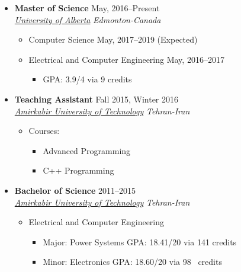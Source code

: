 \documentclass[10pt,a4paper,sans]{moderncv} %
\begin{document}
\begin{itemize}
	\item \textbf{Master of Science} \hfill May, 2016--Present \\ 
	\href{https://ualberta.ca/}{ \emph{University of Alberta}} \hfill \emph{Edmonton-Canada}
	\begin{itemize}
		\item Computer Science \hspace{10 pt}  \hspace{10 pt}  \hfill  May, 2017–2019 (Expected)
		\item Electrical and Computer Engineering \hspace{10 pt}  \hspace{10 pt}  \hfill  May, 2016–2017 
		\begin{itemize}
			\item GPA: 3.9/4 via 9 credits \\
		\end{itemize}
	\end{itemize}

	\item \textbf{Teaching Assistant} \hfill Fall 2015, Winter 2016\\
	\href{http://aut.ac.ir/aut/}{ \emph{Amirkabir University of Technology}} \hfill \emph{Tehran-Iran}
	\begin{itemize}
	\item Courses:
		\begin{itemize}
			\item Advanced Programming 
			\item C++ Programming \\
		\end{itemize}
	\end{itemize}
	
	
	\item \textbf{Bachelor of Science} \hfill 2011--2015 \\
	\href{http://aut.ac.ir/aut/}{ \emph{Amirkabir University of Technology}} \hfill \emph{Tehran-Iran}

	\begin{itemize}
		\item Electrical and Computer Engineering
		\begin{itemize}		
		\item Major: Power Systems \hspace{10 pt} \hfill GPA: 18.41/20 via 141 credits
		\item Minor: Electronics \hspace{36 pt}  \hfill GPA: 18.60/20 via 98\textcolor{white}{1} credits \\
		\end{itemize}
	\end{itemize}

\end{itemize}
\end{document}
